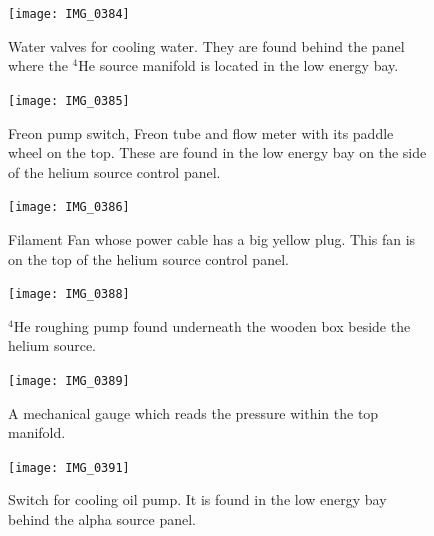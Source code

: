 \documentclass{article}
\begin{document}
\begin{figure}
\begin{center}
\texttt{[image: IMG\_0384]}\\
\end{center}
\caption{\label{figure9}Water valves for cooling water. They are found behind the panel where the $^{4}$He source manifold is located in the low energy bay.}
\end{figure}

\begin{figure}
\begin{center}
\texttt{[image: IMG\_0385]}\\
\end{center}
\caption{\label{figure10}Freon pump switch, Freon tube and flow meter with its paddle wheel on the top. These are found in the low energy bay on the side of the helium source control panel.}
\end{figure}

\begin{figure}
\begin{center}
\texttt{[image: IMG\_0386]}\\
\end{center}
\caption{\label{figure11}Filament Fan whose power cable has a big yellow plug. This fan is on the top of the helium source control panel.}
\end{figure}

\begin{figure}
\begin{center}
\texttt{[image: IMG\_0388]}\\
\end{center}
\caption{\label{figure12}$^{4}$He roughing pump found underneath the wooden box beside the helium source.}
\end{figure}

\begin{figure}
\begin{center}
\texttt{[image: IMG\_0389]}\\
\end{center}
\caption{\label{figure13}A mechanical gauge which reads the pressure within the top manifold.}
\end{figure}

\begin{figure}
\begin{center}
\texttt{[image: IMG\_0391]}\\
\end{center}
\caption{\label{figure14}Switch for cooling oil pump. It is found in the low energy bay behind the alpha source panel.}
\end{figure}
\end{document}
